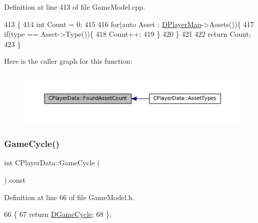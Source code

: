 Definition at line 413 of file Game\+Model.\+cpp.


\begin{DoxyCode}
413                                                \{
414     \textcolor{keywordtype}{int} Count = 0;
415     
416     \textcolor{keywordflow}{for}(\textcolor{keyword}{auto} Asset : \hyperlink{classCPlayerData_a452163191cd4603e1e38dd8d4bb9691c}{DPlayerMap}->Assets())\{
417         \textcolor{keywordflow}{if}(type == Asset->Type())\{
418             Count++;
419         \}
420     \}
421     
422     \textcolor{keywordflow}{return} Count;
423 \}
\end{DoxyCode}
Here is the caller graph for this function\+:
\nopagebreak
\begin{figure}[H]
\begin{center}
\leavevmode
\includegraphics[width=350pt]{classCPlayerData_ac81c0899651bf3f9962b03ef0d7a2415_icgraph}
\end{center}
\end{figure}
\hypertarget{classCPlayerData_a91ef320747b0c6281c05a9284279e16a}{}\label{classCPlayerData_a91ef320747b0c6281c05a9284279e16a} 
\subsubsection{\texorpdfstring{Game\+Cycle()}{GameCycle()}}
{\footnotesize\ttfamily int C\+Player\+Data\+::\+Game\+Cycle (\begin{DoxyParamCaption}{ }\end{DoxyParamCaption}) const\hspace{0.3cm}{\ttfamily [inline]}}



Definition at line 66 of file Game\+Model.\+h.


\begin{DoxyCode}
66                              \{
67             \textcolor{keywordflow}{return} \hyperlink{classCPlayerData_ae92ca06a63a01681dd9f3ddc17c0e106}{DGameCycle};   
68         \};
\end{DoxyCode}
\hypertarget{classCPlayerData_ab82e14be0012e6bedfa2035e1c95ae81}{}\label{classCPlayerData_ab82e14be0012e6bedfa2035e1c95ae81} 

